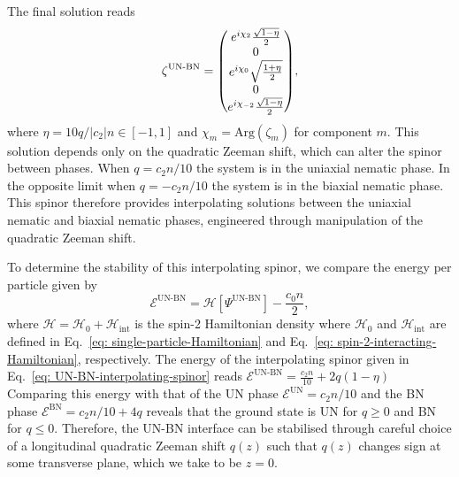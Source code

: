 The final solution reads
\begin{equation}\label{eq: UN-BN-interpolating-spinor}
    \zeta^\text{UN-BN} = \mqty(
    e^{i\chi_2}\frac{\sqrt{1 - \eta}}{2} \\
    0 \\
    e^{i\chi_0}\sqrt{\frac{1 + \eta}{2}} \\
    0 \\
    e^{i\chi_{-2}}\frac{\sqrt{1 - \eta}}{2}
    ),
\end{equation}
where \(\eta = 10q /|c_2|n \in [-1, 1]\) and \(\chi_m = \text{Arg}(\zeta_m)\)
for component \(m\).
This solution depends only on the quadratic Zeeman shift, which can alter the
spinor between phases.
When \(q = c_2n / 10\) the system is in the uniaxial nematic phase.
In the opposite limit when \(q = -c_2n/10\) the system is in the biaxial
nematic phase.
This spinor therefore provides interpolating solutions between the uniaxial
nematic and biaxial nematic phases, engineered through manipulation of the
quadratic Zeeman shift.

To determine the stability of this interpolating spinor, we compare the energy
per particle given by~\cite{Kawaguchi2012}
\begin{equation}
    \mathcal{E}^\text{UN-BN} = \mathcal{H}[\Psi^\text{UN-BN}] - \frac{c_0n}{2},
\end{equation}
where \(\mathcal{H} = \mathcal{H}_0 + \mathcal{H}_\text{int}\) is the spin-2
Hamiltonian density where \(\mathcal{H}_0\) and \(\mathcal{H}_\text{int}\)
are defined in Eq.~\eqref{eq: single-particle-Hamiltonian} and
Eq.~\eqref{eq: spin-2-interacting-Hamiltonian}, respectively.
The energy of the interpolating spinor given in
Eq.~\eqref{eq: UN-BN-interpolating-spinor} reads
\(\mathcal{E}^\text{UN-BN} = \frac{c_2n}{10} + 2q(1 - \eta)\)
Comparing this energy with that of the UN phase
\(\mathcal{E}^\text{UN} = c_2n/10\) and the BN phase
\(\mathcal{E}^\text{BN} = c_2n/10 + 4q\) reveals that the ground state is UN for
\(q \geq 0\) and BN for \(q \leq 0\).
Therefore, the UN-BN interface can be stabilised through careful choice of
a longitudinal quadratic Zeeman shift \(q(z)\) such that \(q(z)\) changes
sign at some transverse plane, which we take to be \(z=0\).

